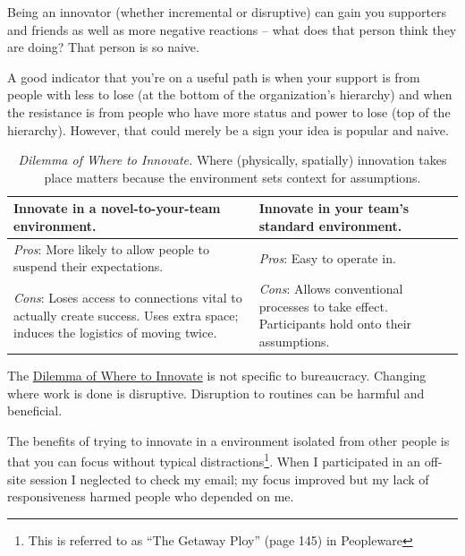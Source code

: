 Being an innovator (whether incremental or disruptive) can gain you supporters and friends as well as more negative reactions -- what does that person think they are doing? That person is so naive.

A good indicator that you're on a useful path is when your support is from people with less to lose (at the bottom of the organization's hierarchy) and when the resistance is from people who have more status and power to lose (top of the hierarchy). However, that could merely be a sign your idea is popular and naive. 




\begin{center}
\begin{table}[H] %
\begin{tabular}{ | m{\dilemmatablewidth}| m{\dilemmatablewidth} | } 
  \hline
  \textbf{Innovate in a novel-to-your-team environment.} &
  \textbf{Innovate in your team's standard environment.} \\
  \hline
  \textit{Pros}: More likely to allow people to suspend their expectations.  & 
  \textit{Pros}: Easy to operate in. \\
  \hline
  \textit{Cons}: Loses access to connections vital to actually create success. Uses extra space; induces the logistics of moving twice. & 
  \textit{Cons}: Allows conventional processes to take effect. Participants hold onto their assumptions. \\
  \hline
\end{tabular}
\caption{
\textit{Dilemma of Where to Innovate.}
Where (physically, spatially) innovation takes place matters because the environment sets context for assumptions.
}
\label{table:where-to-innovate}
\end{table}
\end{center}

The \hyperref[table:where-to-innovate]{Dilemma of Where to Innovate} is not specific to bureaucracy. Changing where work is done is disruptive. Disruption to routines can be harmful and beneficial.

The benefits of trying to innovate in a environment isolated from other people is that you can focus without typical distractions\footnote{This is referred to as ``The Getaway Ploy'' (page 145) in Peopleware\cite{1987_DeMarco}}. When I participated in an off-site session I neglected to check my email; my focus improved but my lack of responsiveness harmed people who depended on me.


